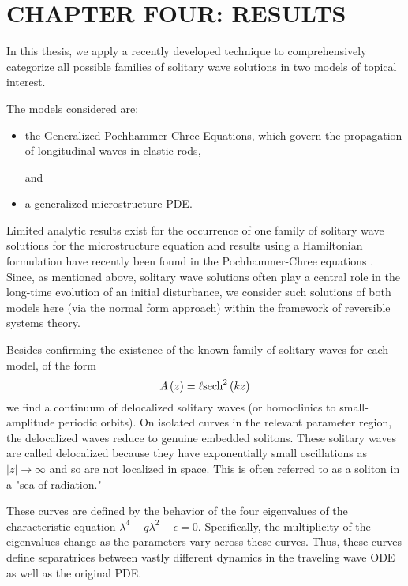 \chapter{CHAPTER FOUR: RESULTS} \label{chapter_4}

In this thesis, we apply a recently developed technique to
comprehensively categorize all possible families of solitary wave
solutions in two models of topical interest.

The models considered are:
\begin{itemize}
\item the Generalized Pochhammer-Chree Equations, which  govern the propagation of longitudinal waves in elastic rods,

and

\item a generalized microstructure PDE.
\end{itemize}

Limited analytic results exist for the occurrence of one family of  solitary
wave solutions for the microstructure equation and results using a Hamiltonian
formulation have recently been found in the Pochhammer-Chree equations \cite{LiZhang}. Since, as
mentioned above, solitary wave solutions often play a central role in the
long-time evolution of an initial disturbance, we consider such solutions of
both models here (via the normal form approach) within the framework of
reversible systems theory.

Besides confirming the existence of the known family of solitary waves for each
model, of the form
\begin{equation} 
A\left(z\right) = \ell \space \mathrm{sech}^2\left(k z\right)
\end{equation}
we find a continuum of delocalized solitary waves (or homoclinics to
small-amplitude periodic orbits).  On isolated curves in the relevant parameter
region, the delocalized waves reduce to genuine embedded solitons. 
These solitary waves are called delocalized because they have exponentially
small oscillations as $|z|\rightarrow\infty$ and so are not localized in space.
This is often referred to as a soliton in a "sea of radiation."

These curves are defined by the behavior of the four eigenvalues of the characteristic
equation $ \lambda^4 - q \lambda^2 - \epsilon =  0$. Specifically, the 
multiplicity of the eigenvalues change as the parameters vary across these curves.
Thus, these curves define separatrices between vastly different dynamics in 
the traveling wave ODE as well as the original PDE.

